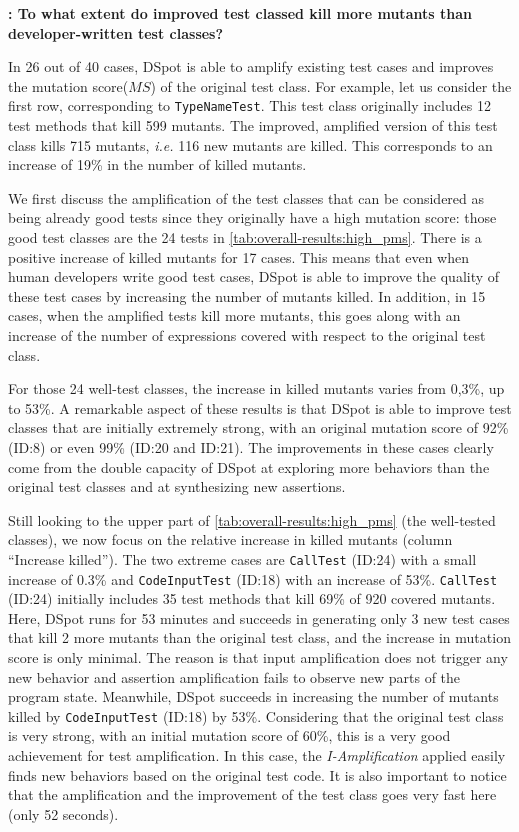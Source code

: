 \documentclass[table,xcdraw,smallextended]{svjour3}
\newcommand{\Iampl}{\emph{I-Amplification}\xspace}
\newcommand{\ie}{\textit{i.e.}\xspace}
\newcommand{\dspot}{DSpot\xspace}
\newcommand{\ms}{mutation score\xspace}
\begin{document}
\textbf{\rqeffectiveness: To what extent do improved test classed kill more mutants than developer-written test classes?}

In 26 out of 40 cases, \dspot{} is able to amplify existing test cases and improves the \ms ($MS$) of the original test class.
For example, let us consider the first row, corresponding to \texttt{TypeNameTest}. This test class originally includes 12 test methods that kill 599 mutants. The improved, amplified version of this test class kills 715 mutants, \ie{} 116 new mutants are killed. This corresponds to an increase of 19\% in the number of killed mutants.

We first discuss the amplification of the test classes that can be considered as being already good tests since they originally have a high \ms: those good test classes are the 24 tests in \autoref{tab:overall-results:high_pms}.
There is a positive increase of killed mutants for 17 cases. This means that even when human developers write good test cases, \dspot{} is able to improve the quality of these test cases by increasing the number of mutants killed. 
In addition, in 15 cases, when the amplified tests kill more mutants, this goes along with an increase of the number of expressions covered with respect to the original test class.

For those 24 well-test classes, the increase in killed mutants varies from 0,3\%, up to 53\%. A remarkable aspect of these results is that \dspot{} is able to improve test classes that are initially extremely strong, with an original \ms of 92\% (ID:8) or even 99\% (ID:20 and ID:21). The improvements in these cases clearly come from the double capacity of \dspot{} at exploring more behaviors than the original test classes and at synthesizing new assertions.

Still looking to the upper part of \autoref{tab:overall-results:high_pms} (the well-tested classes), we now focus on the relative increase in killed mutants (column ``Increase killed''). 
The two extreme cases are \texttt{CallTest} (ID:24) with a small increase of 0.3\% and \texttt{CodeInputTest} (ID:18) with an increase of 53\%.
\texttt{CallTest} (ID:24) initially includes 35 test methods that kill 69\% of 920 covered mutants. Here, \dspot{} runs for 53 minutes and succeeds in generating only 3 new test cases that kill 2 more mutants than the original test class, and the increase in \ms is only minimal. The reason is that input amplification does not trigger any new behavior and assertion amplification fails to observe new parts of the program state. 
Meanwhile, \dspot{} succeeds in increasing the number of mutants killed by \texttt{CodeInputTest} (ID:18) by 53\%. Considering that the original test class is very strong, with an initial \ms of 60\%, this is a very good achievement for test amplification. In this case, the \Iampl applied easily finds new behaviors based on the original test code.
It is also important to notice that the amplification and the improvement of the test class goes very fast here (only 52 seconds). 
\end{document}

